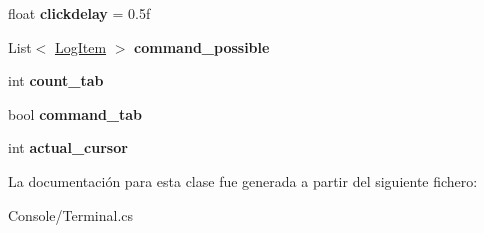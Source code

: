 \begin{DoxyCompactItemize}
float {\bfseries clickdelay} = 0.\+5f
\item 
\mbox{\label{class_command_terminal_1_1_terminal_aa7bf0beac241db27f84e14f60833cab9}} 
List$<$ \mbox{\hyperlink{struct_command_terminal_1_1_log_item}{Log\+Item}} $>$ {\bfseries command\+\_\+possible}
\item 
\mbox{\label{class_command_terminal_1_1_terminal_a05c65b97846b893a2d7fbccc1bd9a7be}} 
int {\bfseries count\+\_\+tab}
\item 
\mbox{\label{class_command_terminal_1_1_terminal_a8da7a3fb5f3d07cf47add7721ac8b726}} 
bool {\bfseries command\+\_\+tab}
\item 
\mbox{\label{class_command_terminal_1_1_terminal_a12b5fd7662b00f7585354f0b58d350b5}} 
int {\bfseries actual\+\_\+cursor}
\end{DoxyCompactItemize}


La documentación para esta clase fue generada a partir del siguiente fichero\+:\begin{DoxyCompactItemize}
\item 
Console/Terminal.\+cs\end{DoxyCompactItemize}
